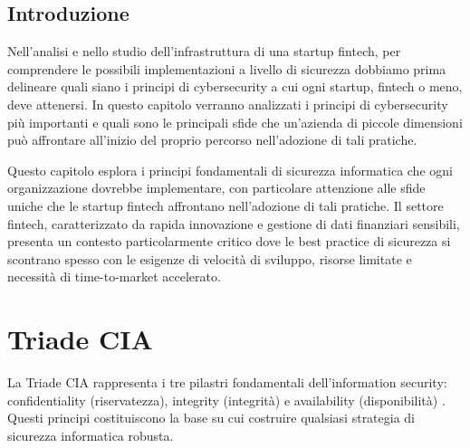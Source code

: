 \subsection{Introduzione}
Nell'analisi e nello studio dell'infrastruttura di una startup fintech, per comprendere le possibili implementazioni a livello di sicurezza dobbiamo prima delineare quali siano i principi di cybersecurity a cui ogni startup, fintech o meno, deve attenersi. In questo capitolo verranno analizzati i principi di cybersecurity più importanti e quali sono le principali sfide che un'azienda di piccole dimensioni può affrontare all'inizio del proprio percorso nell'adozione di tali pratiche.

Questo capitolo esplora i principi fondamentali di sicurezza informatica che ogni organizzazione dovrebbe implementare, con particolare attenzione alle sfide uniche che le startup fintech affrontano nell'adozione di tali pratiche. Il settore fintech, caratterizzato da rapida innovazione e gestione di dati finanziari sensibili, presenta un contesto particolarmente critico dove le best practice di sicurezza si scontrano spesso con le esigenze di velocità di sviluppo, risorse limitate e necessità di time-to-market accelerato.

\section{Triade CIA}
La Triade CIA rappresenta i tre pilastri fondamentali dell'information security: confidentiality (riservatezza), integrity (integrità) e availability (disponibilità) \cite{NIST_SP_1800_26}. Questi principi costituiscono la base su cui costruire qualsiasi strategia di sicurezza informatica robusta.


